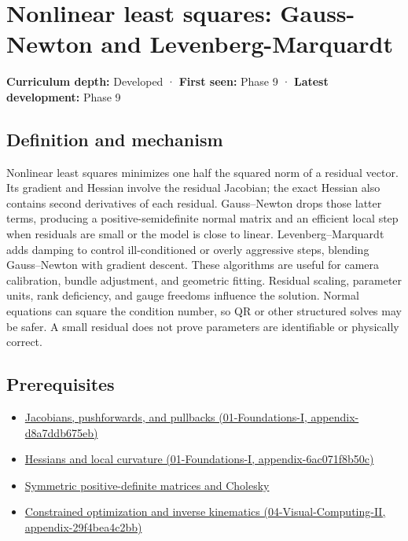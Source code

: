 \hypertarget{appendix-2c2df8345991}{}
\section{Nonlinear least squares: Gauss-Newton and Levenberg-Marquardt}\label{appendix-2c2df8345991-nonlinear-least-squares-gauss-newton-and-levenberg-marquardt}

\textbf{Curriculum depth:} Developed · \textbf{First seen:} Phase 9 · \textbf{Latest development:} Phase 9

\subsection{Definition and mechanism}\label{appendix-2c2df8345991-definition-and-mechanism}

Nonlinear least squares minimizes one half the squared norm of a residual vector. Its gradient and Hessian involve the residual Jacobian; the exact Hessian also contains second derivatives of each residual. Gauss--Newton drops those latter terms, producing a positive-semidefinite normal matrix and an efficient local step when residuals are small or the model is close to linear. Levenberg--Marquardt adds damping to control ill-conditioned or overly aggressive steps, blending Gauss--Newton with gradient descent. These algorithms are useful for camera calibration, bundle adjustment, and geometric fitting. Residual scaling, parameter units, rank deficiency, and gauge freedoms influence the solution. Normal equations can square the condition number, so QR or other structured solves may be safer. A small residual does not prove parameters are identifiable or physically correct.

\subsection{Prerequisites}\label{appendix-2c2df8345991-prerequisites}

\begin{itemize}
\tightlist
\item
  \href{../01-Foundations-I/main.pdf\#nameddest=appendix-d8a7ddb675eb}{Jacobians, pushforwards, and pullbacks (01-Foundations-I, appendix-d8a7ddb675eb)}
\item
  \href{../01-Foundations-I/main.pdf\#nameddest=appendix-6ac071f8b50c}{Hessians and local curvature (01-Foundations-I, appendix-6ac071f8b50c)}
\item
  \hyperref[appendix-50d2ea3c9b26]{Symmetric positive-definite matrices and Cholesky}
\item
  \href{../04-Visual-Computing-II/main.pdf\#nameddest=appendix-29f4bea4c2bb}{Constrained optimization and inverse kinematics (04-Visual-Computing-II, appendix-29f4bea4c2bb)}
\end{itemize}

